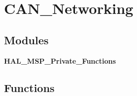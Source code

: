 \section{C\+A\+N\+\_\+\+Networking}
\label{group___c_a_n___networking}
\subsection*{Modules}
\begin{DoxyCompactItemize}
\item 
\textbf{ H\+A\+L\+\_\+\+M\+S\+P\+\_\+\+Private\+\_\+\+Functions}
\end{DoxyCompactItemize}
\subsection*{Functions}

